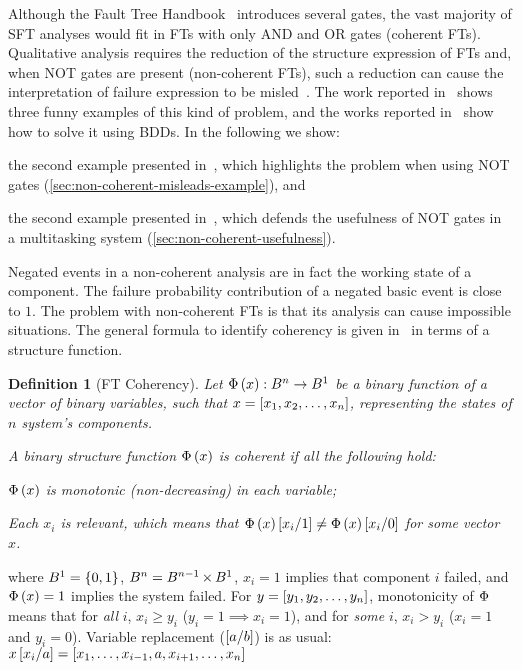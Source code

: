 \documentclass[12pt,openright,twoside,a4paper,oldfontcommands,english,brazil,draft]{abntex2}
\newtheorem{Def}{Definition}[chapter]
\theoremstyle{theo}
\def\FThandbook{Fault Tree Handbook~\cite{VGR+1981}\index{Fault Tree!Handbook}%
  \gdef\FThandbook{Fault Tree Handbook\index{Fault Tree!Handbook}\xspace}%
  \xspace}
\newcommand{\setsin}[1]{\ensuremath\left\{ #1 \right\}}
\newcommand{\parsin}[1]{\ensuremath\left( #1 \right)}
\newcommand{\squaresin}[1]{\ensuremath\left[ #1 \right]}
\def\cartesian{\ensuremath\operatorname{\times}}
\def\ftcoherencyop{\ensuremath\operatorname{\Phi}}
\newcommand{\ftcoherency}[1]{\ensuremath\ftcoherencyop\parsin{#1}}
\newcommand{\replace}[2]{\ensuremath\squaresin{#1\middle/#2}}
\begin{document}
Although the \FThandbook introduces several gates, the vast majority of \ac{SFT} analyses would fit in \acp{FT} with only \ac{AND} and \ac{OR} gates (coherent \acp{FT}).
Qualitative analysis requires the reduction of the structure expression of \acp{FT} and, when \ac{NOT} gates are present (non-coherent \acp{FT}), such a reduction can cause the interpretation of failure expression to be misled~\cite{Andrews2001,Oliv2006,AB2003,CCR2008,Vaurio2016}.
The work reported in~\cite{Oliv2006} shows three funny examples of this kind of problem, and the works reported in~\cite{Andrews2001,Oliv2006,CCR2008} show how to solve it using \acp{BDD}.
In the following we show:
\begin{alineasinline}
  \item the second example presented in~\cite{Oliv2006}, which highlights the problem when using \ac{NOT} gates (\cref{sec:non-coherent-misleads-example}), and
  \item the second example presented in~\cite{Andrews2001}, which defends the usefulness of \ac{NOT} gates in a multitasking system (\cref{sec:non-coherent-usefulness}).
\end{alineasinline}

Negated events in a non-coherent analysis are in fact the working state of a component.
The failure probability contribution of a negated basic event is close to $1$.
The problem with non-coherent \acp{FT} is that its analysis can cause impossible situations.
The general formula to identify coherency is given in~\cite{Andrews2001,CCR2008} in terms of a structure function.

\begin{Def}[\ac{FT} Coherency]
\label{def:ft-coherency}
Let $\ftcoherency{x}:B^n \rightarrow B^1$ be a binary function of a vector of binary variables, such that $x = \squaresin{x_1, x_2,\ldots,x_n}$, representing the states of $n$ system's components.

A binary structure function $\ftcoherency{x}$ is coherent if all the following hold:
\begin{alineas}
  \item $\ftcoherency{x}$ is monotonic (non-decreasing) in each variable;
  \item Each $x_i$ is relevant, which means that $\ftcoherency{x}\replace{x_i}{1} \neq \ftcoherency{x}\replace{x_i}{0}$ for some vector $x$.
\end{alineas}%
\end{Def}%
%
\noindent where $B^1 = \setsin{0,1}$, $B^n = B^{n-1} \cartesian B^1$, $x_i = 1$ implies that component $i$ failed, and $\ftcoherency{x} = 1$ implies the system failed.
For $y = \squaresin{y_1,y_2,\ldots,y_n}$, monotonicity of $\ftcoherencyop$ means that for \emph{all} $i$, $x_i \ge y_i$ ($y_i = 1 \implies x_i = 1$), and for \emph{some} $i$, $x_i > y_i$ ($x_i = 1$ and $y_i = 0$).
Variable replacement ($\replace{a}{b}$) is as usual:
$x\replace{x_i}{a} = \squaresin{x_1, \ldots, x_{i-1}, a, x_{i+1}, \ldots, x_n}$
\end{document}
